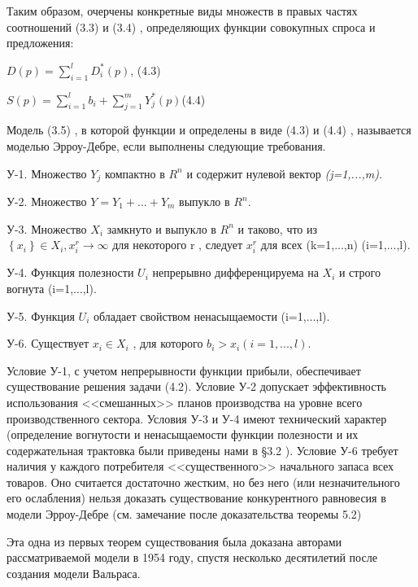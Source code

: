 \documentclass[12pt, 4paper]{book}
\begin{document}
{Таким образом, очерчены конкретные виды множеств в правых частях соотношений (3.3) и (3.4) , определяющих функции совокупных спроса и предложения:
\begin{center}
$D(p)=\sum\limits_{i=1}^{l}D_{i}^{*}(p)$, (4.3)
\end{center}
\begin{center}
$S(p)=\sum\limits_{i=1}^{l}b_i + \sum\limits_{j=1}^{m}Y_{j}^{*}(p)$(4.4)
\end{center}
Модель (3.5) , в которой функции и определены в виде (4.3) и (4.4) , называется моделью Эрроу-Дебре, если выполнены следующие требования.
\par

У-1. Множество $Y_j$ компактно в $R^{n}$ и содержит нулевой вектор \textit{(j=1,...,m)}.
\par
 
У-2. Множество $Y=Y_1+...+Y_m$ выпукло в $R^n$.
\par
 
У-3. Множество $X_i$ замкнуто и выпукло в $R^n$ и таково, что из $\left\{x_i\right\} \in X_i,x_{i}^{r} \rightarrow \infty$ для некоторого r , следует $x_{i}^{r}$ для всех (k=1,...,n) (i=1,...,l). 
\par

У-4. Функция полезности $U_i$ непрерывно дифференцируема на $X_i$ и строго вогнута (i=1,...,l). 
\par

У-5. Функция $U_i$ обладает свойством ненасыщаемости (i=1,...,l). 
\par

У-6. Существует $x_i \in X_i$ , для которого $b_i > x_i (i=1,...,l)$.
\par

Условие У-1, с учетом непрерывности функции прибыли, обеспечивает существование решения задачи (4.2). Условие У-2 допускает эффективность использования <<смешанных>> планов производства на уровне всего производственного сектора. Условия У-3 и У-4 имеют технический характер (определение вогнутости и ненасыщаемости функции полезности и их содержательная трактовка были приведены нами в §3.2 ). Условие У-6 требует наличия у каждого потребителя <<существенного>> начального запаса всех товаров. Оно считается достаточно жестким, но без него (или незначительного его ослабления) нельзя доказать существование конкурентного равновесия в модели Эрроу-Дебре (см. замечание после доказательства теоремы 5.2)
\par

Эта одна из первых теорем существования была доказана авторами рассматриваемой модели в 1954 году, спустя несколько десятилетий после создания модели Вальраса.
\par

}
\end{document}
